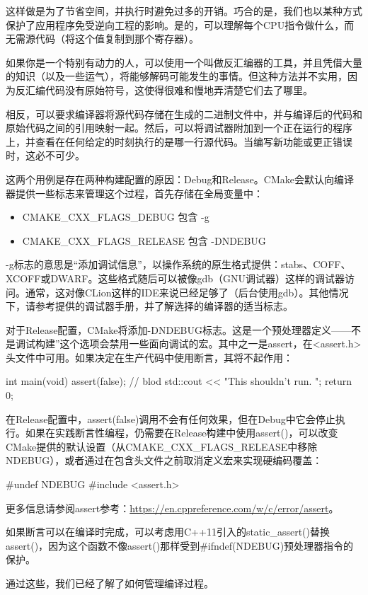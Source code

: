 这样做是为了节省空间，并执行时避免过多的开销。巧合的是，我们也以某种方式保护了应用程序免受逆向工程的影响。是的，可以理解每个CPU指令做什么，而无需源代码（将这个值复制到那个寄存器）。

如果你是一个特别有动力的人，可以使用一个叫做反汇编器的工具，并且凭借大量的知识（以及一些运气），将能够解码可能发生的事情。但这种方法并不实用，因为反汇编代码没有原始符号，这使得很难和慢地弄清楚它们去了哪里。

相反，可以要求编译器将源代码存储在生成的二进制文件中，并与编译后的代码和原始代码之间的引用映射一起。然后，可以将调试器附加到一个正在运行的程序上，并查看在任何给定的时刻执行的是哪一行源代码。当编写新功能或更正错误时，这必不可少。

这两个用例是存在两种构建配置的原因：Debug和Release。CMake会默认向编译器提供一些标志来管理这个过程，首先存储在全局变量中：

\begin{itemize}
\item
CMAKE\_CXX\_FLAGS\_DEBUG 包含 -g

\item
CMAKE\_CXX\_FLAGS\_RELEASE 包含 -DNDEBUG
\end{itemize}

-g标志的意思是“添加调试信息”，以操作系统的原生格式提供：stabs、COFF、XCOFF或DWARF。这些格式随后可以被像gdb（GNU调试器）这样的调试器访问。通常，这对像CLion这样的IDE来说已经足够了（后台使用gdb）。其他情况下，请参考提供的调试器手册，并了解选择的编译器的适当标志。

对于Release配置，CMake将添加-DNDEBUG标志。这是一个预处理器定义——不是调试构建”这个选项会禁用一些面向调试的宏。其中之一是assert，在<assert.h>头文件中可用。如果决定在生产代码中使用断言，其将不起作用：

\begin{cpp}
int main(void)
{
    assert(false); // blod
    std::cout << "This shouldn't run. \n";
    return 0;
}
\end{cpp}

在Release配置中，assert(false)调用不会有任何效果，但在Debug中它会停止执行。如果在实践断言性编程，仍需要在Release构建中使用assert()，可以改变CMake提供的默认设置（从CMAKE\_CXX\_FLAGS\_RELEASE中移除NDEBUG），或者通过在包含头文件之前取消定义宏来实现硬编码覆盖：

\begin{cpp}
#undef NDEBUG
#include <assert.h>
\end{cpp}

更多信息请参阅assert参考：\url{https://en.cppreference.com/w/c/error/assert}。

如果断言可以在编译时完成，可以考虑用C++11引入的static\_assert()替换assert()，因为这个函数不像assert()那样受到\#ifndef(NDEBUG)预处理器指令的保护。

通过这些，我们已经了解了如何管理编译过程。











